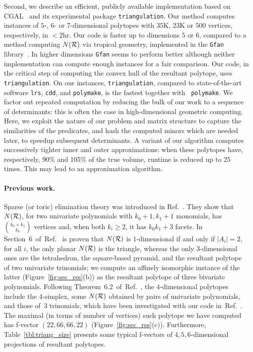 \documentclass{article}
\newcommand\refcite[1]{\citealp{#1}} \newcommand\citess[1]{\textsuperscript{\textup{\citealp{#1}}}}
\begin{document}
Second, we describe an efficient, publicly available implementation
based on CGAL~\citess{CGAL}
and its experimental package {\tt triangulation}.
Our method computes instances of $5$-, $6$- or $7$-dimensional polytopes
with $35$K, $23$K or $500$ vertices, respectively, in $<2$hr.
Our code is faster up to dimensions $5$ or $6$, compared to a method computing 
$N({\mathcal R})$ via tropical geometry, implemented in the {\tt Gfan} 
library~\citess{JensenYu11}. In higher dimensions {\tt Gfan} seems to perform 
better although neither implementation can compute enough instances for a fair comparison.
Our code, in the critical step of computing the convex hull of the resultant
polytope, uses {\tt triangulation}.
On our instances, {\tt triangulation}, compared to state-of-the-art software
{\tt lrs}, {\tt cdd}, and {\tt polymake}, is the fastest together with {\tt
polymake}.
We factor out repeated computation by reducing the bulk of our
work to a sequence of determinants: this is often the case 
in high-dimensional geometric computing.
Here, we exploit the nature of our problem and matrix structure to capture the
similarities of the predicates, and hash the computed minors which are needed later,
to speedup subsequent determinants.
A variant of our algorithm computes successively tighter inner and outer
approximations: when these polytopes have, respectively,
90\% and 105\% of the true volume, runtime is reduced up to $25$ times.
This may lead to an approximation algorithm.  


\paragraph{Previous work.}
Sparse (or toric) elimination theory was introduced in Ref.~\refcite{GKZ}.
They show that $N({\mathcal R})$,
for two univariate polynomials with $k_0+1,k_1+1$
monomials, has $\binom{k_0+k_1}{k_0}$ vertices and, when both $k_i\ge 2$,
it has $k_0k_1+3$ facets.
In Section~6~of~Ref.~\refcite{St94} is proven that $N({\mathcal R})$ is $1$-dimensional
if and only if $|A_i|=2$, for all $i$, the only planar $N({\mathcal R})$
is the triangle, whereas the only $3$-dimensional ones are the tetrahedron,
the square-based pyramid, and the resultant polytope of two univariate trinomials;
we compute an affinely isomorphic instance of the latter (Figure~\ref{fig:sec_res}(b))
as the resultant polytope of three bivariate polynomials.
Following Theorem~6.2~of~Ref.~\refcite{St94}, the $4$-dimensional polytopes
include
the 4-simplex, some $N({\mathcal R})$ obtained by pairs of univariate polynomials,
and those of~3 trinomials, which have been investigated with our
code in~Ref.~\refcite{DEF12}. 
The maximal (in terms of number of vertices) such polytope we have computed has
f-vector $(22,66,66,22)$ (Figure~\ref{fig:sec_res}(c)). 
Furthermore, Table~\ref{tbl:triang_size} presents some typical f-vectors of
$4,5,6$-dimensional projections of resultant polytopes. 
\end{document}
